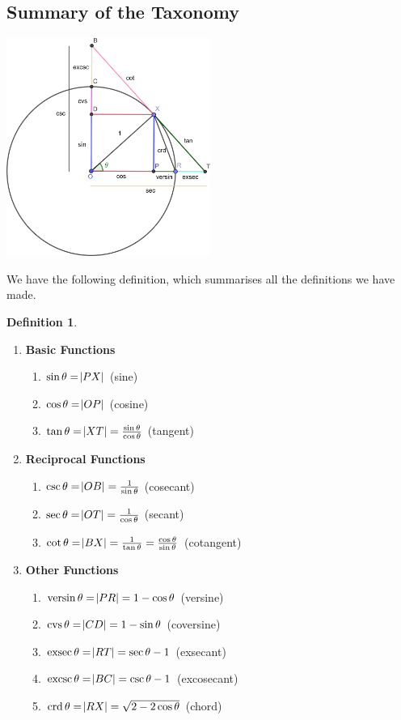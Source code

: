\documentclass[a4paper,leqno]{article}
\numberwithin{equation}{section}
\theoremstyle{definition}
\newtheorem{defn}[equation]{Definition}
\theoremstyle{remark}
\DeclareMathOperator{\versin}{versin}
\DeclareMathOperator{\cvs}{cvs}
\DeclareMathOperator{\exsec}{exsec}
\DeclareMathOperator{\excsc}{excsc}
\DeclareMathOperator{\crd}{crd}
\begin{document}
\subsection{Summary of the Taxonomy}
\begin{center}
  \includegraphics[width=0.5\textwidth]{taxonomyall}
\end{center}
We have the following definition, which summarises all the definitions we have made.
\begin{defn}\leavevmode
  \begin{enumerate}
    \item \textbf{Basic Functions}
      \begin{enumerate}
        \item $ \sin \theta = \abs{PX} $ (sine)
        \item $ \cos \theta = \abs{OP} $ (cosine)
        \item $ \tan \theta = \abs{XT} = \frac{\sin \theta}{\cos \theta} $ (tangent)
      \end{enumerate}
    \item \textbf{Reciprocal Functions}
      \begin{enumerate}
        \item $ \csc \theta = \abs{OB} = \frac{1}{\sin\theta} $ (cosecant)
        \item $ \sec \theta = \abs{OT} = \frac{1}{\cos\theta} $ (secant)
        \item $ \cot \theta = \abs{BX} = \frac{1}{\tan\theta} = \frac{\cos\theta}{\sin\theta} $ (cotangent)
      \end{enumerate}
    \item \textbf{Other Functions}
      \begin{enumerate}
        \item $ \versin \theta = \abs{PR} = 1 - \cos \theta $ (versine)
        \item $ \cvs \theta = \abs{CD} = 1 - \sin \theta $ (coversine)
        \item $ \exsec \theta = \abs{RT} = \sec \theta - 1 $ (exsecant)
        \item $ \excsc \theta = \abs{BC} = \csc \theta - 1$ (excosecant)
        \item $ \crd \theta = \abs{RX} = \sqrt{2 - 2\cos \theta} $ (chord)
      \end{enumerate}
  \end{enumerate}
\end{defn}
\end{document}
